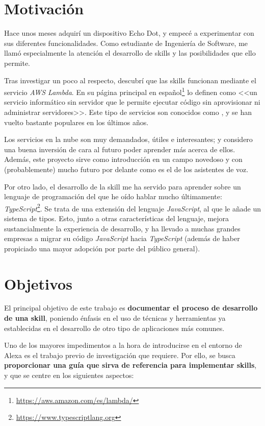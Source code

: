 \documentclass[11pt,spanish,listoffigures,listoftables,table,hyphens,dvipsnames]{tfgetsinf}
\newcommand{\fe}[1]{\foreign{english}{#1}}
\begin{document}
\section{Motivación}

Hace unos meses adquirí un dispositivo Echo Dot, y empecé a experimentar con sus diferentes funcionalidades. Como estudiante de Ingeniería de Software, me llamó especialmente la atención el desarrollo de skills y las posibilidades que ello permite.

Tras investigar un poco al respecto, descubrí que las skills funcionan mediante el servicio \emph{AWS Lambda}. En su página principal en español\footnote{\url{https://aws.amazon.com/es/lambda/}} lo definen como
<<un servicio informático sin servidor que le permite ejecutar código sin aprovisionar ni administrar servidores>>. Este tipo de servicios son conocidos como \fe{serverless}, y se han vuelto bastante populares en los últimos años.

Los servicios en la nube son muy demandados, útiles e interesantes; y considero una buena inversión de cara al futuro poder aprender más acerca de ellos. Además, este proyecto sirve como introducción en un campo novedoso y con (probablemente) mucho futuro por delante como es el de los asistentes de voz.

Por otro lado, el desarrollo de la skill me ha servido para aprender sobre un lenguaje de programación del que he oído hablar mucho últimamente: \emph{TypeScript}\footnote{\url{https://www.typescriptlang.org}}. Se trata de una extensión del lenguaje \emph{JavaScript}, al que le añade un sistema de tipos. Esto, junto a otras características del lenguaje, mejora sustancialmente la experiencia de desarrollo, y ha llevado a muchas grandes empresas a migrar su código \emph{JavaScript} hacia \emph{TypeScript} (además de haber propiciado una mayor adopción por parte del público general).

\section{Objetivos}

El principal objetivo de este trabajo es \textbf{documentar el proceso de desarrollo de una skill}, poniendo énfasis en el uso de técnicas y herramientas ya establecidas en el desarrollo de otro tipo de aplicaciones más comunes.

Uno de los mayores impedimentos a la hora de introducirse en el entorno de Alexa es el trabajo previo de investigación que requiere. Por ello, se busca \textbf{proporcionar una guía que sirva de referencia para implementar skills}, y que se centre en los siguientes aspectos:
\end{document}
